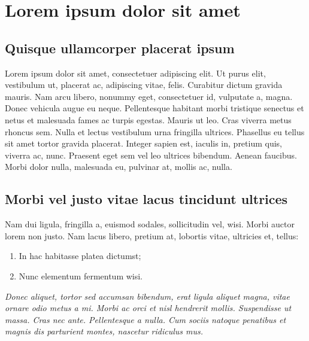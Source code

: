 
\section{Lorem ipsum dolor sit amet}

\subsection{Quisque ullamcorper placerat ipsum}

Lorem ipsum dolor sit amet, consectetuer adipiscing elit. Ut purus elit, vestibulum ut, placerat ac, adipiscing vitae, felis. Curabitur dictum gravida mauris. Nam arcu libero, nonummy eget, consectetuer id, vulputate a, magna. Donec vehicula augue eu neque. Pellentesque habitant morbi tristique senectus et netus et malesuada fames ac turpis egestas. Mauris ut leo. Cras viverra metus rhoncus sem. Nulla et lectus vestibulum urna fringilla ultrices.  Phasellus eu tellus sit amet tortor gravida placerat. Integer sapien est, iaculis in, pretium quis, viverra ac, nunc. Praesent eget sem vel leo ultrices bibendum. Aenean faucibus. Morbi dolor nulla, malesuada eu, pulvinar at, mollis ac, nulla. %

\subsection{Morbi vel justo vitae lacus tincidunt ultrices}

Nam dui ligula, fringilla a, euismod sodales, sollicitudin vel, wisi. Morbi auctor lorem non justo. Nam lacus libero, pretium at, lobortis vitae, ultricies et, tellus:

\begin{enumerate}
\item In hac habitasse platea dictumst;
\item Nunc elementum fermentum wisi.
\end{enumerate}

\noindent\textit{Donec aliquet, tortor sed accumsan bibendum, erat ligula aliquet magna, vitae ornare odio metus a mi. Morbi ac orci et nisl hendrerit mollis. Suspendisse ut massa. Cras nec ante. Pellentesque a nulla. Cum sociis natoque penatibus et magnis dis parturient montes, nascetur ridiculus mus.} %

